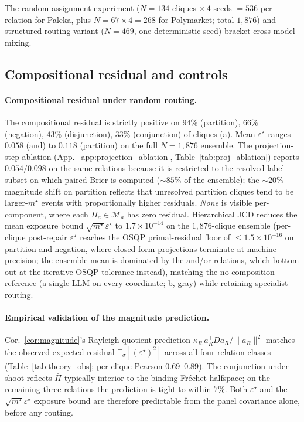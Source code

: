 \documentclass{article}
\theoremstyle{plain}
\theoremstyle{definition}
\theoremstyle{remark}
\newcommand{\Mloc}{\mathcal{M}_a}
\newcommand{\E}{\mathbb{E}}
\newcommand{\eps}{\varepsilon}
\begin{document}
The random-assignment experiment ($N\!=\!134$ cliques
$\times\,4$ seeds $=\!536$ per relation for Paleka, plus
$N\!=\!67\!\times\!4\!=\!268$ for Polymarket; total $1{,}876$)
and structured-routing variant ($N\!=\!469$, one deterministic
seed) bracket cross-model mixing.

\subsection{Compositional residual and controls}
\label{subsec:compres_results}

\paragraph{Compositional residual under random routing.}
The compositional residual is strictly positive on $94\%$ (partition),
$66\%$ (negation), $43\%$ (disjunction), $33\%$ (conjunction) of
cliques (a). Mean $\eps^\star$ ranges $0.058$
(and) to $0.118$ (partition) on the full $N\!=\!1{,}876$ ensemble.
The projection-step ablation
(App.~\ref{app:projection_ablation}, Table~\ref{tab:proj_ablation})
reports $0.054/0.098$ on the same relations because it is restricted
to the resolved-label subset on which paired Brier is computed
($\sim\!85\%$ of the ensemble); the $\sim\!20\%$ magnitude shift on
partition reflects that unresolved partition cliques tend to be
larger-$m^\star$ events with proportionally higher residuals.
\emph{None} is visible per-component,
where each $\Pi_a\!\in\!\Mloc$ has zero residual. Hierarchical JCD
reduces the mean exposure bound $\sqrt{m^\star}\eps^\star$ to
$1.7\!\times\!10^{-14}$ on the $1{,}876$-clique ensemble
(per-clique post-repair $\eps^\star$ reaches the
\textsc{OSQP} primal-residual floor of
$\le\!1.5\!\times\!10^{-16}$ on partition and negation, where
closed-form projections terminate at machine precision;
the ensemble mean is dominated by the and/or relations, which
bottom out at the iterative-OSQP tolerance instead), matching the no-composition reference (a single LLM on every
coordinate; b, gray) while retaining
specialist routing.

\paragraph{Empirical validation of the magnitude prediction.}
Cor.~\ref{cor:magnitude}'s Rayleigh-quotient prediction
$\kappa_R\,a_R^\top D a_R/\|a_R\|^2$ matches the observed
expected residual $\E_\sigma[(\eps^\star)^2]$ across all four
relation classes (Table~\ref{tab:theory_obs}; per-clique Pearson
$0.69$--$0.89$). The conjunction under-shoot reflects $\bar\Pi$
typically interior to the binding Fr\'echet halfspace; on the
remaining three relations the prediction is tight to within
$7\%$. Both $\eps^\star$ and the $\sqrt{m^\star}\eps^\star$
exposure bound are therefore predictable from the panel covariance
alone, before any routing.
\end{document}
